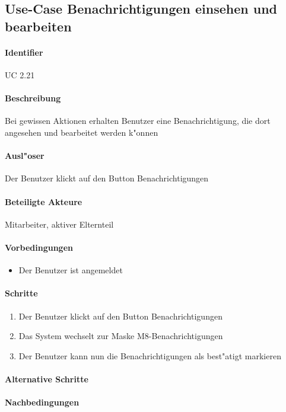   
  \newpage
 \subsection{Use-Case Benachrichtigungen einsehen und bearbeiten}
  \paragraph{Identifier}
  UC 2.21
  \paragraph{Beschreibung}
  Bei gewissen Aktionen erhalten Benutzer eine Benachrichtigung, die dort angesehen und bearbeitet werden k"onnen
  \paragraph{Ausl"oser}
  Der Benutzer klickt auf den Button \dq Benachrichtigungen\dq
  \paragraph{Beteiligte Akteure}   \leavevmode \newline
    Mitarbeiter, aktiver Elternteil
  \paragraph{Vorbedingungen}
  \begin{itemize}
   \item Der Benutzer ist angemeldet
  \end{itemize}

  \paragraph{Schritte}
  \begin{enumerate}
   \item Der Benutzer klickt auf den Button \dq Benachrichtigungen\dq
   \item Das System wechselt zur Maske M8-Benachrichtigungen
   \item Der Benutzer kann nun die Benachrichtigungen als best"atigt markieren
  \end{enumerate}

  \paragraph{Alternative Schritte}
  \paragraph{Nachbedingungen}

